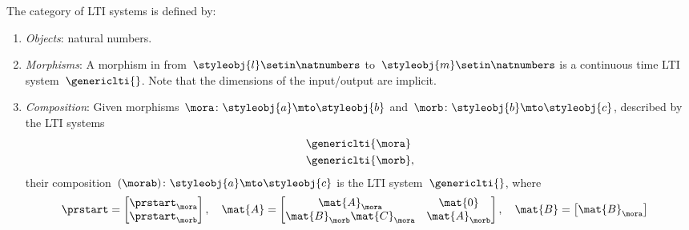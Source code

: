 \begin{ctdefinition}
    \label{def:LTICat}
    The category \LTI of LTI systems is defined by:
    \begin{enumerate}
        \item \emph{Objects}: natural numbers.
        \item \emph{Morphisms}: A morphism in \LTI from~$\styleobj{l}\setin \natnumbers$ to~$\styleobj{m}\setin \natnumbers$ is a continuous time LTI system~$\genericlti{}$.
              Note that the dimensions of the input/output are implicit.
        \item \emph{Composition}: Given morphisms~$\mora \colon \styleobj{a}\mto \styleobj{b}$ and~$\morb\colon \styleobj{b}\mto \styleobj{c}$, described by the LTI systems
              \begin{equation}
                  \begin{aligned}
                       & \genericlti{\mora} \\
                       & \genericlti{\morb},
                  \end{aligned}
              \end{equation}
              their composition~$(\morab)\colon \styleobj{a}\mto \styleobj{c}$ is the LTI system~$\genericlti{}$, where
              \begin{equation}
                  \begin{aligned}
                      \prstart & =\begin{bmatrix}
                                      \prstart_\mora \\
                                      \prstart_\morb \\
                                  \end{bmatrix},\quad
                      \mat{A}=\begin{bmatrix}
                                  \mat{A}_\mora              & \mat{0}       \\
                                  \mat{B}_\morb\mat{C}_\mora & \mat{A}_\morb
                              \end{bmatrix},\quad
                      \mat{B}=\begin{bmatrix}
                                  \mat{B}_\mora \\

\end{bmatrix}
\end{aligned}
\end{equation}
\end{enumerate}
\end{ctdefinition}
